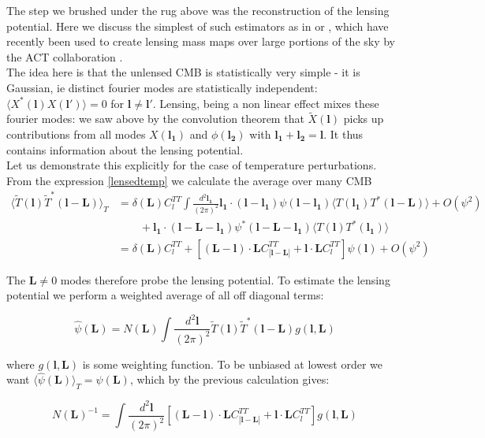 \documentclass[a4paper,10pt]{article}
\renewcommand{\v}[1]{\mathbf{#1}}
\newcommand{\finttwo}[1]{\int \frac{d^2 \v{#1}}{(2\pi)^2}}
\begin{document}
The step we brushed under the rug above was the reconstruction of the lensing potential. Here we discuss the simplest of such estimators as in \cite{hu-estimator} or \cite{lewis}, which have recently been used to create lensing mass maps over large portions of the sky by the ACT collaboration \cite{darwish}. \\

The idea here is that the unlensed CMB is statistically very simple - it is Gaussian, ie distinct fourier modes are statistically independent: $\langle X^*(\v{l})X(\v{l'})\rangle =0$ for  $\v{l} \neq \v{l'}$. Lensing, being a non linear effect mixes these fourier modes: we saw above by the convolution theorem that  $\tilde{X}(\v{l})$ picks up contributions from all modes ${X}(\v{l_1})$ and $\phi(\v{l_2})$ with $\v{l_1}+\v{l_2}=\v{l}$. It thus contains information about the lensing potential.\\

Let us demonstrate this explicitly for the case of temperature perturbations. From the expression \ref{lensedtemp} we calculate the average over many CMB
\begin{equation}\begin{split}
\langle \tilde{T}(\v{l})\tilde{T}^*(\v{l}-\v{L})\rangle_{T} &= \delta(\v{L})C_l^{TT} \finttwo{l_1}  \v{l_1}\cdot(\v{l}-\v{l_1})\psi(\v{l}-\v{l_1}) \langle T(\v{l_1})T^*(\v{l}-\v{L})\rangle + O(\psi^2) \\
&\qquad + \v{l_1}\cdot(\v{l}-\v{L}-\v{l_1})\psi^*(\v{l}-\v{L}-\v{l_1}) \langle T(\v{l})T^*(\v{l_1})\rangle\\
&=\delta(\v{L})C_l^{TT} + [(\v{L}-\v{l})\cdot\v{L}C^{TT}_{|\v{l}-\v{L}|}+\v{l}\cdot\v{L}C_l^{TT}]\psi(\v{l}) + O(\psi^2)
\end{split}\end{equation}

The $\v{L}\neq 0 $ modes therefore probe the lensing potential. To estimate the lensing potential we perform a weighted average of all off diagonal terms:

\begin{equation}
\hat{\psi}(\v{L}) = N(\v{L})\finttwo{l} \tilde{T}(\v{l})\tilde{T}^*(\v{l-L})g(\v{l},\v{L})
\end{equation}

where $g(\v{l},\v{L})$ is some weighting function. To be unbiased at lowest order we want $\langle \hat{\psi}(\v{L}) \rangle_T = \psi(\v{L})$, which by the previous calculation gives:

\begin{equation}
N(\v{L})^{-1} = \finttwo{l} [(\v{L}-\v{l})\cdot\v{L}C^{TT}_{|\v{l}-\v{L}|}+\v{l}\cdot\v{L}C_l^{TT}]g(\v{l},\v{L})
\end{equation}
\end{document}
